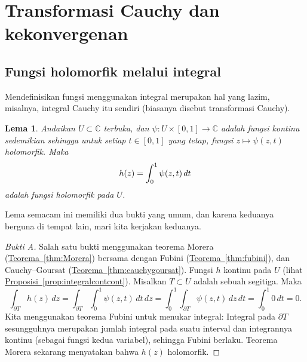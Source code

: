 \documentclass[12pt,openany]{book}
\newcommand{\avoidbreak}{\postdisplaypenalty=100}
\newcommand{\C}{{\mathbb{C}}}
\theoremstyle{plain}
\newtheorem{lemma}[thm]{Lema}
\theoremstyle{remark}
\theoremstyle{definition}
\theoremstyle{exercise}
\theoremstyle{example}
\newcommand{\thmref}[1]{\hyperref[#1]{Teorema~\ref*{#1}}}
\newcommand{\propref}[1]{\hyperref[#1]{Proposisi~\ref*{#1}}}
\begin{document}

\section{Transformasi Cauchy dan kekonvergenan}

\subsection{Fungsi holomorfik melalui integral}

Mendefinisikan fungsi menggunakan integral merupakan hal yang lazim, misalnya,
integral Cauchy itu sendiri (biasanya disebut transformasi Cauchy).

\begin{lemma} \label{lemma:holfuncbyintegral}
Andaikan $U \subset \C$ terbuka, dan
$\psi \colon U \times [0,1] \to \C$ adalah fungsi kontinu sedemikian sehingga
untuk setiap $t \in [0,1]$ yang tetap, fungsi $z \mapsto \psi(z,t)$
holomorfik.  Maka
\begin{equation*}
h(z) =
\int_0^1 \psi(z,t) \, dt
\avoidbreak
\end{equation*}
adalah fungsi holomorfik pada $U$.
\end{lemma}

Lema semacam ini memiliki dua bukti yang umum,
dan karena keduanya berguna di tempat lain, mari kita kerjakan keduanya.

\begin{proof}[Bukti A]
Salah satu bukti menggunakan teorema Morera (\thmref{thm:Morera})
bersama dengan Fubini (\thmref{thm:fubini}), dan Cauchy--Goursat
(\thmref{thm:cauchygoursat}).
Fungsi $h$ kontinu pada $U$ (lihat \propref{prop:integralcontcont}).
Misalkan $T \subset U$ adalah sebuah segitiga.  Maka
\begin{equation*}
\int_{\partial T}
h(z)
\, dz
=
\int_{\partial T}
\int_0^1 \psi(z,t) \, dt
\, dz
=
\int_0^1
\int_{\partial T}
\psi(z,t)
\, dz
\, dt
= \int_0^1 0 \, dt = 0.
\end{equation*}
Kita menggunakan teorema Fubini untuk menukar integral:
Integral pada $\partial T$ sesungguhnya merupakan jumlah integral pada suatu interval
dan integrannya kontinu (sebagai fungsi kedua variabel), sehingga Fubini berlaku.
Teorema Morera sekarang menyatakan bahwa $h(z)$
holomorfik.
\end{proof}
\end{document}
